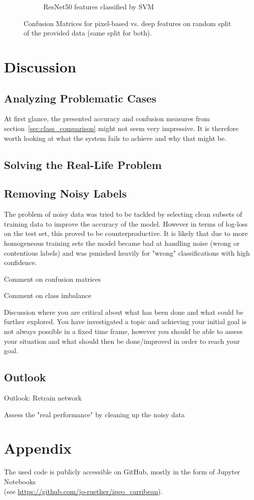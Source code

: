 \documentclass[11pt]{article}
\begin{document}
\begin{figure}
\begin{subfigure}[t]{.5\textwidth}
			\caption{ResNet50 features classified by SVM}
		\end{subfigure}
	\caption{Confusion Matrices for pixel-based vs. deep features on random split of the provided data (same split for both).}
	\label{fig:pixel_based_cm}
	\end{figure}
	
	
	\section{Discussion}
	\label{sec:discussion}
	
	\subsection{Analyzing Problematic Cases}
	At first glance, the presented accuracy and confusion measures from section~\ref{sec:class_comparison} might not seem very impressive. It is therefore worth looking at what the system fails to achieve and why that might be.
	
	
	
	\subsection{Solving the Real-Life Problem}
	
	\subsection{Removing Noisy Labels}
	The problem of noisy data was tried to be tackled by selecting clean subsets of training data to improve the accuracy of the model. However in terms of log-loss on the test set, this proved to be counterproductive. It is likely that due to more homogeneous training sets the model became bad at handling noise (wrong or contentious labels) and was punished heavily for "wrong" classifications with high confidence.
	
	Comment on confusion matrices
	
	Comment on class imbalance
	
	
	Discussion where you are critical about what has been done and what could be further explored. You have investigated a topic and achieving your initial goal is not always possible in a fixed time frame, however you should be able to assess your situation and what should then be done/improved in order to reach your goal.
	
	\subsection{Outlook}
	Outlook: Retrain network
	
	Assess the "real performance" by cleaning up the noisy data
	
	\section{Appendix}

	The used code is publicly accessible on GitHub, mostly in the form of Jupyter Notebooks \\
	(see \url{https://github.com/jo-ruether/ipeo_carribean}).
	
	
	 
	
\end{document}

